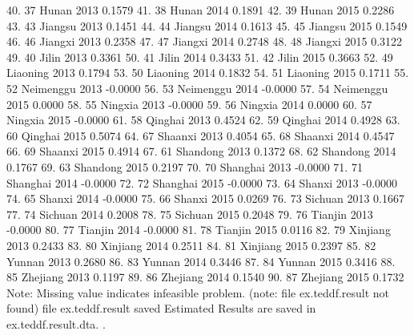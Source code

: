  40. {\VBAR}  37          Hunan   2013    0.1579 {\VBAR}
 41. {\VBAR}  38          Hunan   2014    0.1891 {\VBAR}
 42. {\VBAR}  39          Hunan   2015    0.2286 {\VBAR}
 43. {\VBAR}  43        Jiangsu   2013    0.1451 {\VBAR}
 44. {\VBAR}  44        Jiangsu   2014    0.1613 {\VBAR}
 45. {\VBAR}  45        Jiangsu   2015    0.1549 {\VBAR}
 46. {\VBAR}  46        Jiangxi   2013    0.2358 {\VBAR}
 47. {\VBAR}  47        Jiangxi   2014    0.2748 {\VBAR}
 48. {\VBAR}  48        Jiangxi   2015    0.3122 {\VBAR}
 49. {\VBAR}  40          Jilin   2013    0.3361 {\VBAR}
 50. {\VBAR}  41          Jilin   2014    0.3433 {\VBAR}
 51. {\VBAR}  42          Jilin   2015    0.3663 {\VBAR}
 52. {\VBAR}  49       Liaoning   2013    0.1794 {\VBAR}
 53. {\VBAR}  50       Liaoning   2014    0.1832 {\VBAR}
 54. {\VBAR}  51       Liaoning   2015    0.1711 {\VBAR}
 55. {\VBAR}  52      Neimenggu   2013   -0.0000 {\VBAR}
 56. {\VBAR}  53      Neimenggu   2014   -0.0000 {\VBAR}
 57. {\VBAR}  54      Neimenggu   2015    0.0000 {\VBAR}
 58. {\VBAR}  55        Ningxia   2013   -0.0000 {\VBAR}
 59. {\VBAR}  56        Ningxia   2014    0.0000 {\VBAR}
 60. {\VBAR}  57        Ningxia   2015   -0.0000 {\VBAR}
 61. {\VBAR}  58        Qinghai   2013    0.4524 {\VBAR}
 62. {\VBAR}  59        Qinghai   2014    0.4928 {\VBAR}
 63. {\VBAR}  60        Qinghai   2015    0.5074 {\VBAR}
 64. {\VBAR}  67        Shaanxi   2013    0.4054 {\VBAR}
 65. {\VBAR}  68        Shaanxi   2014    0.4547 {\VBAR}
 66. {\VBAR}  69        Shaanxi   2015    0.4914 {\VBAR}
 67. {\VBAR}  61       Shandong   2013    0.1372 {\VBAR}
 68. {\VBAR}  62       Shandong   2014    0.1767 {\VBAR}
 69. {\VBAR}  63       Shandong   2015    0.2197 {\VBAR}
 70. {\VBAR}  70       Shanghai   2013   -0.0000 {\VBAR}
 71. {\VBAR}  71       Shanghai   2014   -0.0000 {\VBAR}
 72. {\VBAR}  72       Shanghai   2015   -0.0000 {\VBAR}
 73. {\VBAR}  64         Shanxi   2013   -0.0000 {\VBAR}
 74. {\VBAR}  65         Shanxi   2014   -0.0000 {\VBAR}
 75. {\VBAR}  66         Shanxi   2015    0.0269 {\VBAR}
 76. {\VBAR}  73        Sichuan   2013    0.1667 {\VBAR}
 77. {\VBAR}  74        Sichuan   2014    0.2008 {\VBAR}
 78. {\VBAR}  75        Sichuan   2015    0.2048 {\VBAR}
 79. {\VBAR}  76        Tianjin   2013   -0.0000 {\VBAR}
 80. {\VBAR}  77        Tianjin   2014   -0.0000 {\VBAR}
 81. {\VBAR}  78        Tianjin   2015    0.0116 {\VBAR}
 82. {\VBAR}  79       Xinjiang   2013    0.2433 {\VBAR}
 83. {\VBAR}  80       Xinjiang   2014    0.2511 {\VBAR}
 84. {\VBAR}  81       Xinjiang   2015    0.2397 {\VBAR}
 85. {\VBAR}  82         Yunnan   2013    0.2680 {\VBAR}
 86. {\VBAR}  83         Yunnan   2014    0.3446 {\VBAR}
 87. {\VBAR}  84         Yunnan   2015    0.3416 {\VBAR}
 88. {\VBAR}  85       Zhejiang   2013    0.1197 {\VBAR}
 89. {\VBAR}  86       Zhejiang   2014    0.1540 {\VBAR}
 90. {\VBAR}  87       Zhejiang   2015    0.1732 {\VBAR}
     {\BLC}
Note: Missing value indicates infeasible problem.
(note: file ex.teddf.result not found)
file ex.teddf.result saved
{\smallskip}
Estimated Results are saved in ex.teddf.result.dta.
{\smallskip}
. 
